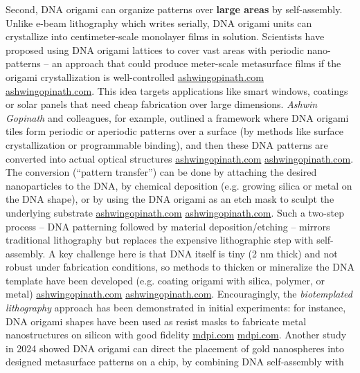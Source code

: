 \documentclass[11pt,a4paper]{article}
\begin{document}
Second, DNA origami can organize patterns over \textbf{large areas} by self-assembly. Unlike e-beam lithography which writes serially, DNA origami units can crystallize into centimeter-scale monolayer films in solution. Scientists have proposed using DNA origami lattices to cover vast areas with periodic nano-patterns -- an approach that could produce meter-scale metasurface films if the origami crystallization is well-controlled \href{https://ashwingopinath.com/large-area-nanopatterning#:~:text=A unique class of second,of metal nanoparticles that passively}{ashwingopinath.com} \href{https://ashwingopinath.com/large-area-nanopatterning#:~:text=while there are niche applications,be ideal for this purpose}{ashwingopinath.com}. This idea targets applications like smart windows, coatings or solar panels that need cheap fabrication over large dimensions. \emph{Ashwin Gopinath} and colleagues, for example, outlined a framework where DNA origami tiles form periodic or aperiodic patterns over a surface (by methods like surface crystallization or programmable binding), and then these DNA patterns are converted into actual optical structures \href{https://ashwingopinath.com/large-area-nanopatterning#:~:text=Figure ,large area patterning could be}{ashwingopinath.com} \href{https://ashwingopinath.com/large-area-nanopatterning#:~:text=An intriguing alternative to using,e illustrates a potential}{ashwingopinath.com}. The conversion (``pattern transfer'') can be done by attaching the desired nanoparticles to the DNA, by chemical deposition (e.g. growing silica or metal on the DNA shape), or by using the DNA origami as an etch mask to sculpt the underlying substrate \href{https://ashwingopinath.com/large-area-nanopatterning#:~:text=Figure ,large area patterning could be}{ashwingopinath.com} \href{https://ashwingopinath.com/large-area-nanopatterning#:~:text=An intriguing alternative to using,e illustrates a potential}{ashwingopinath.com}. Such a two-step process -- DNA patterning followed by material deposition/etching -- mirrors traditional lithography but replaces the expensive lithographic step with self-assembly. A key challenge here is that DNA itself is tiny (2 nm thick) and not robust under fabrication conditions, so methods to thicken or mineralize the DNA template have been developed (e.g. coating origami with silica, polymer, or metal) \href{https://ashwingopinath.com/large-area-nanopatterning#:~:text=An intriguing alternative to using,e illustrates a potential}{ashwingopinath.com} \href{https://ashwingopinath.com/large-area-nanopatterning#:~:text=a silica structure of identical,features of the DNA origami}{ashwingopinath.com}. Encouragingly, the \emph{biotemplated lithography} approach has been demonstrated in initial experiments: for instance, DNA origami shapes have been used as resist masks to fabricate metal nanostructures on silicon with good fidelity \href{https://www.mdpi.com/2079-6374/12/11/962#:~:text=DNA origami can be designed,a hard mask for surface}{mdpi.com} \href{https://www.mdpi.com/2079-6374/12/11/962#:~:text=DNA origami can be organized,lithography to create discrete%2C well}{mdpi.com}. Another study in 2024 showed DNA origami can direct the placement of gold nanospheres into designed metasurface patterns on a chip, by combining DNA self-assembly with 
\end{document}
